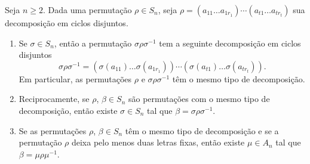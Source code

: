 \begin{lema}\label{ciclos_conjugados}
	Seja $n \ge 2$. Dada uma permuta\c{c}\~ao $\rho \in S_n$, seja $\rho = (a_{11}\dots a_{1r_1})\cdots (a_{t1}\dots a_{tr_t})$ sua decomposi\c{c}\~ao em ciclos disjuntos.
	\begin{enumerate}
		\item Se $\sigma \in S_n$, ent\~ao a permuta\c{c}\~ao $\sigma\rho\sigma^{-1}$ tem a seguinte decomposi\c{c}\~ao em ciclos disjuntos
		\[
			\sigma\rho\sigma^{-1} = (\sigma(a_{11})\dots \sigma(a_{1r_1}))\cdots (\sigma(a_{t1})\dots \sigma(a_{tr_t})).
		\]
		Em particular, as permuta\c{c}\~oes $\rho$ e $\sigma\rho\sigma^{-1}$ t\^em o mesmo tipo de decomposi\c{c}\~ao.

		\item Reciprocamente, se $\rho$, $\beta \in S_n$ s\~ao permuta\c{c}\~oes com o mesmo tipo de decomposi\c{c}\~ao, ent\~ao existe $\sigma \in S_n$ tal que $\beta = \sigma\rho\sigma^{-1}$.

		\item Se as permuta\c{c}\~oes $\rho$, $\beta \in S_n$ t\^em o mesmo tipo de decomposi\c{c}\~ao e se a permuta\c{c}\~ao $\rho$ deixa pelo menos duas letras fixas, ent\~ao existe $\mu \in A_n$ tal que $\beta = \mu\rho\mu^{-1}$.
	\end{enumerate}
\end{lema}

